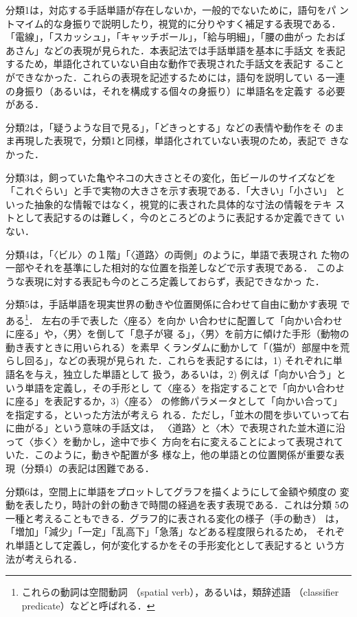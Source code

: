 分類1は，対応する手話単語が存在しないか，一般的でないために，語句をパ
ントマイム的な身振りで説明したり，視覚的に分りやすく補足する表現である．
「電線」，「スカッシュ」，「キャッチボール」，「給与明細」，「腰の曲がっ
たおばあさん」などの表現が見られた．本表記法では手話単語を基本に手話文
を表記するため，単語化されていない自由な動作で表現された手話文を表記す
ることができなかった．これらの表現を記述するためには，語句を説明してい
る一連の身振り（あるいは，それを構成する個々の身振り）に単語名を定義す
る必要がある．

分類2は，「疑うような目で見る」，「どきっとする」などの表情や動作をそ
のまま再現した表現で，分類1と同様，単語化されていない表現のため，表記で
きなかった．

分類3は，飼っていた亀やネコの大きさとその変化，缶ビールのサイズなどを
「これぐらい」と手で実物の大きさを示す表現である．「大きい」「小さい」
といった抽象的な情報ではなく，視覚的に表された具体的な寸法の情報をテキ
ストとして表記するのは難しく，今のところどのように表記するか定義できて
いない．

分類4は，「〈ビル〉の１階」「〈道路〉の両側」のように，単語で表現され
た物の一部やそれを基準にした相対的な位置を指差しなどで示す表現である．
このような表現に対する表記も今のところ定義しておらず，表記できなかっ
た．

分類5は，手話単語を現実世界の動きや位置関係に合わせて自由に動かす表現
である\footnote{これらの動詞は空間動詞
  （spatial verb），あるいは，類辞述語
  （classifier predicate）などと呼ばれる\cite{Sutton-Spence1999}．}．
左右の手で表した〈座る〉を向か
い合わせに配置して「向かい合わせに座る」や，〈男〉を倒して「息子が寝
る」，〈男〉を前方に傾けた手形（動物の動き表すときに用いられる）を素早
くランダムに動かして「（猫が）部屋中を荒らし回る」，などの表現が見られ
た．これらを表記するには，1) それぞれに単語名を与え，独立した単語として
扱う，あるいは，2) 例えば「向かい合う」という単語を定義し，その手形とし
て〈座る〉を指定することで「向かい合わせに座る」を表記するか，3)〈座る〉
の修飾パラメータとして「向かい合って」を指定する，といった方法が考えら
れる．ただし，「並木の間を歩いていって右に曲がる」という意味の手話文は，
〈道路〉と〈木〉で表現された並木道に沿って〈歩く〉を動かし，途中で歩く
方向を右に変えることによって表現されていた．このように，動きや配置が多
様な上，他の単語との位置関係が重要な表現（分類4）の表記は困難である．

分類6は，空間上に単語をプロットしてグラフを描くようにして金額や頻度の
変動を表したり，時計の針の動きで時間の経過を表す表現である．これは分類
5の一種と考えることもできる．グラフ的に表される変化の様子（手の動き）
は，「増加」「減少」「一定」「乱高下」「急落」などある程度限られるため，
それぞれ単語として定義し，何が変化するかをその手形変化として表記すると
いう方法が考えられる．

